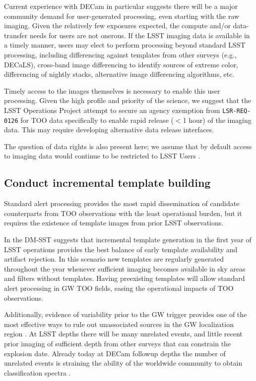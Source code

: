\documentclass[DM,authoryear,toc]{lsstdoc}
\begin{document}
Current experience with DECam in particular suggests there will be a major community demand for user-generated processing, even starting with the raw imaging. 
Given the relatively few exposures expected, the compute and/or data-transfer needs for users are not onerous.
If the LSST imaging data is available in a timely manner, users may elect to perform processing beyond standard LSST processing, including differencing against templates from other surveys (e.g., DECaLS), cross-band image differencing to identify sources of extreme color, differencing of nightly stacks, alternative image differencing algorithms, etc.

Timely access to the images themselves is necessary to enable this user processing.
Given the high profile and priority of the science, we suggest that the LSST Operations Project attempt to secure an agency exemption from \texttt{LSR-REQ-0126} for TOO data specifically to enable rapid release ($<$1 hour) of the imaging data.
This may require developing alternative data release interfaces.

The question of data rights is also present here; we assume that by default access to imaging data would continue to be restricted to LSST Users .


\subsection{Conduct incremental template building} \label{sec:templates}

Standard alert processing provides the most rapid dissemination of candidate counterparts from TOO observations with the least operational burden, but it requires the existence of template images from prior LSST observations.

In  the DM-SST suggests that incremental template generation in the first year of LSST operations provides the best balance of early template availability and artifact rejection.
In this scenario new templates are regularly generated throughout the year whenever sufficient imaging becomes available in sky areas and filters without templates.
Having preexisting templates will allow standard alert processing in GW TOO fields, easing the operational impacts of TOO observations.

Additionally, evidence of variability prior to the GW trigger provides one of the most effective ways to rule out unassociated sources in the GW localization region \citep[e.g.,][]{2019GCN.24223....1C, 2019GCN.26430....1S}.
At LSST depths there will be many unrelated events, and little recent prior imaging of sufficient depth from other surveys that can constrain the explosion date.
Already today at DECam followup depths the number of unrelated events is straining the ability of the worldwide community to obtain classification spectra \citep[e.g.,][]{2019ApJ...881L..16A}.
\end{document}
